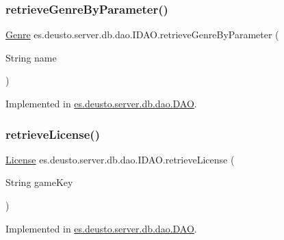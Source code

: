 \subsubsection{\texorpdfstring{retrieve\+Genre\+By\+Parameter()}{retrieveGenreByParameter()}}
{\footnotesize\ttfamily \hyperlink{classes_1_1deusto_1_1server_1_1db_1_1data_1_1_genre}{Genre} es.\+deusto.\+server.\+db.\+dao.\+I\+D\+A\+O.\+retrieve\+Genre\+By\+Parameter (\begin{DoxyParamCaption}\item[{String}]{name }\end{DoxyParamCaption})}



Implemented in \hyperlink{classes_1_1deusto_1_1server_1_1db_1_1dao_1_1_d_a_o_a1442de50d193b561a382edcac5837660}{es.\+deusto.\+server.\+db.\+dao.\+D\+AO}.

\mbox{\label{interfacees_1_1deusto_1_1server_1_1db_1_1dao_1_1_i_d_a_o_a6a3e25055d4a81c738d1bd73de6ef7da}} 
\subsubsection{\texorpdfstring{retrieve\+License()}{retrieveLicense()}}
{\footnotesize\ttfamily \hyperlink{classes_1_1deusto_1_1server_1_1db_1_1data_1_1_license}{License} es.\+deusto.\+server.\+db.\+dao.\+I\+D\+A\+O.\+retrieve\+License (\begin{DoxyParamCaption}\item[{String}]{game\+Key }\end{DoxyParamCaption})}



Implemented in \hyperlink{classes_1_1deusto_1_1server_1_1db_1_1dao_1_1_d_a_o_a02fd634e6bd7a087b1476ab161af646f}{es.\+deusto.\+server.\+db.\+dao.\+D\+AO}.

\mbox{\label{interfacees_1_1deusto_1_1server_1_1db_1_1dao_1_1_i_d_a_o_a19f9b0d0b6f5f80730d6d197deca7dfc}} 
